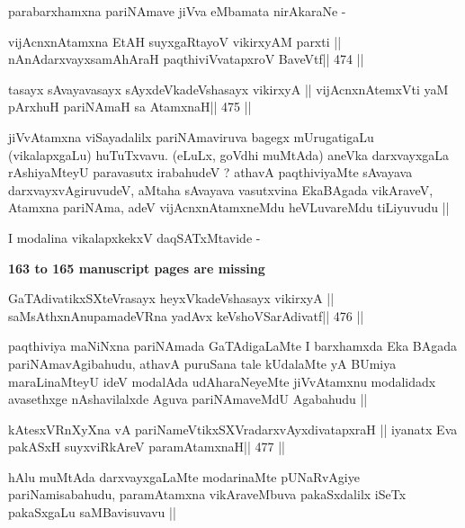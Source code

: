 \begin{artha}
parabarxhamxna pariNAmave jiVva eMbamata nirAkaraNe -
\end{artha}

\begin{shl}
vijAcnxnAtamxna EtAH suyxgaRtayoV vikirxyAM parxti ||
nAnAdarxvayxsamAhAraH paqthiviVvatapxroV BaveVtf\hfill || 474 ||
\end{shl}

\begin{shl}
tasayx sAvayavasayx sAyxdeVkadeVshasayx vikirxyA ||
vijAcnxnAtemxVti yaM pArxhuH pariNAmaH sa AtamxnaH\hfill || 475 ||
\end{shl}

\begin{artha}
jiVvAtamxna viSayadalilx pariNAmaviruva bagegx mUrugatigaLu
(vikalapxgaLu) huTuTxvavu. (eLuLx, goVdhi muMtAda) aneVka darxvayxgaLa
rAshiyaMteyU paravasutx irabahudeV ? athavA paqthiviyaMte sAvayava
darxvayxvAgiruvudeV, aMtaha sAvayava vasutxvina EkaBAgada vikAraveV,
Atamxna pariNAma, adeV vijAcnxnAtamxneMdu heVLuvareMdu tiLiyuvudu ||

I modalina vikalapxkekxV daqSATxMtavide -
\end{artha}

\begin{center}
{\LARGE{\textbf{{\rm 163 to 165 manuscript pages are missing}}}}
\end{center}

\begin{shl}
GaTAdivatikxSXteVrasayx heyxVkadeVshasayx vikirxyA ||
saMsAthxnAnupamadeVRna yadAvx keVshoVSarAdivatf\hfill || 476 ||
\end{shl}

\begin{artha}
paqthiviya maNiNxna pariNAmada GaTAdigaLaMte I barxhamxda Eka BAgada
pariNAmavAgibahudu, athavA puruSana tale kUdalaMte yA BUmiya
maraLinaMteyU ideV modalAda udAharaNeyeMte jiVvAtamxnu modalidadx
avasethxge nAshavilalxde Aguva pariNAmaveMdU Agabahudu ||  
\end{artha}

\begin{shl}
kAtesxVRnXyXna vA pariNameVtikxSXVradarxvAyxdivatapxraH ||
iyanatx Eva pakASxH suyxviRkAreV paramAtamxnaH\hfill || 477 ||
\end{shl}

\begin{artha}
hAlu muMtAda darxvayxgaLaMte modarinaMte pUNaRvAgiye pariNamisabahudu,
paramAtamxna vikAraveMbuva pakaSxdalilx iSeTx pakaSxgaLu saMBavisuvavu ||
\end{artha}

